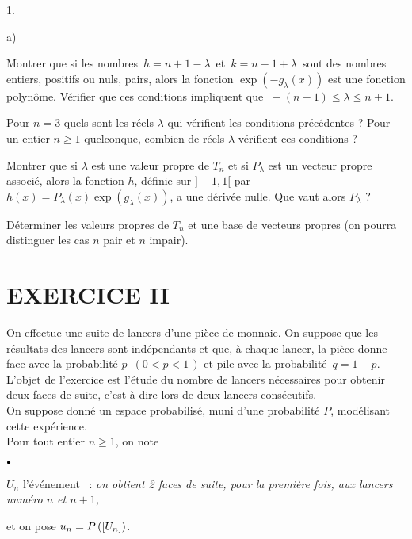 \documentclass[11pt]{article}%
\begin{document}
\begin{noliste}{1.}
\begin{noliste}{a)}
\item Montrer que si les nombres $\,h = n + 1 - \lambda\, $ et $\, k =
n - 1
 + \lambda\, $ sont des nombres entiers, positifs ou nuls, pairs, alors
la
fonction $\exp(-g_{\lambda}(x))$ est une fonction polyn\^{o}me.
Vérifier que
ces conditions impliquent que $\; -(n-1) \leq \lambda \leq n + 1$.

\item Pour $n = 3$ quels sont les réels $\lambda$ qui vérifient les
conditions précédentes ? Pour un entier $n \geq 1$ quelconque,
combien de réels $\lambda$ vérifient ces conditions ?

\item Montrer que si $\lambda$ est une valeur propre de $T_{n}$ et si
$P_\lambda$ est un vecteur propre associé, alors la fonction $h$,
définie
sur $]-1,1[$ par $h(x) = P_\lambda(x) \exp(g_\lambda(x))$, a une
dérivée
nulle. Que vaut alors $P_\lambda$ ?

\item Déterminer les valeurs propres de $T_{n}$ et une base de vecteurs
propres (on pourra distinguer les cas $n$ pair et $n$ impair).
\end{noliste}
\end{noliste}

\section*{EXERCICE II}

On effectue une suite de lancers d'une pièce de monnaie. On suppose que
les résultats des lancers sont indépendants et que, à chaque lancer, la
pièce
donne face avec la probabilité $p$ $\,(0<p<1\,)$ et pile avec la
probabilité 
$\,q = 1-p$.\\
L'objet de l'exercice est l'étude du nombre de lancers nécessaires pour
obtenir deux faces de suite, c'est à dire lors de deux lancers
consécutifs.\\
On suppose donné un espace probabilisé, muni d'une probabilité $P$,
modélisant cette expérience.\\
Pour tout entier $n\geq 1$, on note

\begin{noliste}{$\scriptstyle \bullet$}
\item $U_{n}$ l'événement~ : \textsl{on obtient 2 faces de suite, pour
la
première fois, aux lancers numéro $n$ et $n + 1$,}
\end{noliste}

et on pose $u_{n} = P\left(\left[ {U_{n}} \right]\right)$.
\end{document}
